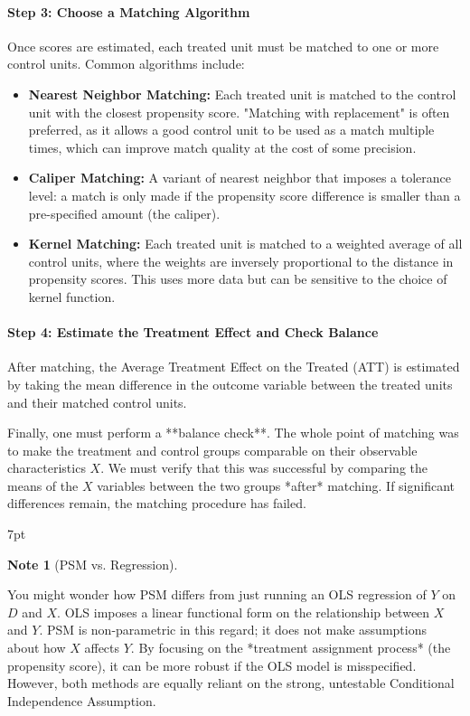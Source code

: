 \documentclass{article}
\providecommand{\tightlist}{
  \setlength{\itemsep}{0pt}
  \setlength{\parskip}{0pt}}
\newenvironment{blueblock}{
\def\FrameCommand{
  \hspace{1pt}
    {\color{DarkBlue}
    \vrule width 2pt}
    {\color{blueshade}
    \vrule width 4pt}
  \colorbox{blueshade}
}
\MakeFramed{
  \advance
  \hsize-
  \width
  \FrameRestore}
\noindent\hspace{-4.55pt}%
\begin{adjustwidth}{}{7pt}
\vspace{2pt}\vspace{2pt}
}
{\vspace{2pt}\end{adjustwidth}\endMakeFramed}
\newtheorem{note}{Note}
\begin{document}
\paragraph{Step 3: Choose a Matching Algorithm}
Once scores are estimated, each treated unit must be matched to one or more control units. Common algorithms include:
\begin{itemize}
    \tightlist
    \item \textbf{Nearest Neighbor Matching:} Each treated unit is matched to the control unit with the closest propensity score. "Matching with replacement" is often preferred, as it allows a good control unit to be used as a match multiple times, which can improve match quality at the cost of some precision.
    \item \textbf{Caliper Matching:} A variant of nearest neighbor that imposes a tolerance level: a match is only made if the propensity score difference is smaller than a pre-specified amount (the caliper).
    \item \textbf{Kernel Matching:} Each treated unit is matched to a weighted average of all control units, where the weights are inversely proportional to the distance in propensity scores. This uses more data but can be sensitive to the choice of kernel function.
\end{itemize}

\paragraph{Step 4: Estimate the Treatment Effect and Check Balance}
After matching, the Average Treatment Effect on the Treated (ATT) is estimated by taking the mean difference in the outcome variable between the treated units and their matched control units.

Finally, one must perform a **balance check**. The whole point of matching was to make the treatment and control groups comparable on their observable characteristics $X$. We must verify that this was successful by comparing the means of the $X$ variables between the two groups *after* matching. If significant differences remain, the matching procedure has failed.

\begin{blueblock}
\begin{note}[PSM vs. Regression]
\end{note}
You might wonder how PSM differs from just running an OLS regression of $Y$ on $D$ and $X$. OLS imposes a linear functional form on the relationship between $X$ and $Y$. PSM is non-parametric in this regard; it does not make assumptions about how $X$ affects $Y$. By focusing on the *treatment assignment process* (the propensity score), it can be more robust if the OLS model is misspecified. However, both methods are equally reliant on the strong, untestable Conditional Independence Assumption.
\end{blueblock}
\end{document}
